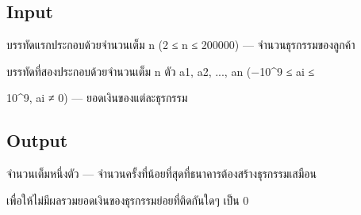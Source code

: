\documentclass{article}
\begin{document}
\subsection*{Input}
บรรทัดแรกประกอบด้วยจำนวนเต็ม n (2 ≤ n ≤ 200000) --- จำนวนธุรกรรมของลูกค้า



บรรทัดที่สองประกอบด้วยจำนวนเต็ม n ตัว a1, a2, ..., an (−10\^{}9 ≤ ai ≤

10\^{}9, ai ≠ 0) --- ยอดเงินของแต่ละธุรกรรม\\



\subsection*{Output}
จำนวนเต็มหนึ่งตัว --- จำนวนครั้งที่น้อยที่สุดที่ธนาคารต้องสร้างธุรกรรมเสมือน

เพื่อให้ไม่มีผลรวมยอดเงินของธุรกรรมย่อยที่ติดกันใดๆ เป็น 0\\
\end{document}
